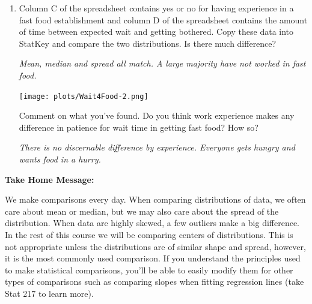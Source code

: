 \begin{enumerate}
\begin{key}
  {\it The overall median is 15 minutes, so that would keep half the
  customers happy. The most impatient 10\% are at or below 5 minutes
  and 5 \% is 12 who want their food in 4 minutes. }
\end{key}


  \item  Column C of the spreadsheet contains yes or no for having
    experience in a fast food establishment and column D of the
    spreadsheet contains the amount of time between expected wait and
    getting bothered.  Copy these data into StatKey and compare the
    two distributions.  Is there much difference?
\begin{students}
    \vspace{5cm}    
\end{students}

\begin{key}
  {\it Mean, median and spread all match. A large majority have not
    worked in fast food.}

  \texttt{[image: plots/Wait4Food-2.png]}

\end{key}


Comment on what you've found.  Do you think work experience makes any
difference in patience for wait time in getting fast food? How so? 
\begin{students}
    \vspace{\fill}    
\end{students}

\begin{key}
  {\it There is no discernable
    difference by experience. Everyone gets hungry and wants food in a
  hurry. }
\end{key}


\end{enumerate}






\begin{center}
  {\bf Take Home Message:}
\end{center}

We make comparisons every day.  When comparing distributions of data,
we often care about mean or median, but we may also care about the
spread of the distribution.  When data are highly skewed, a few
outliers make a big difference.  In the rest of this course we will be
comparing centers of distributions.  This is not appropriate unless
the distributions are of similar shape and spread, however, it is the
most commonly used comparison.  If you understand the principles used
to make statistical comparisons, you'll be able to easily modify them
for other types of comparisons such as comparing slopes when fitting
regression lines (take Stat 217 to learn more).  



